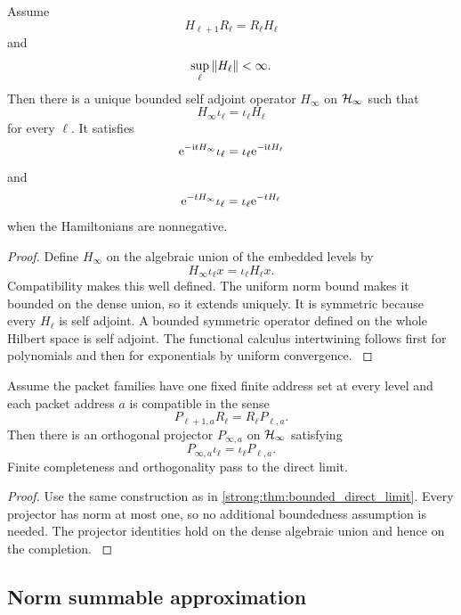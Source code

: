 \begin{theorem}\label{strong:theorem:045}\label{strong:thm:bounded_direct_limit}
Assume
\[
H_{\ell+1}R_\ell=R_\ell H_\ell
\]
and
\[
\sup_\ell\left\lVert H_\ell\right\rVert<\infty.
\]
Then there is a unique bounded self adjoint operator \(H_\infty\) on \(\Hcal_\infty\) such that
\[
H_\infty\iota_\ell=\iota_\ell H_\ell
\]
for every \(\ell\). It satisfies
\[
\e^{-\ii tH_\infty}\iota_\ell
=
\iota_\ell\e^{-\ii tH_\ell}
\]
and
\[
\e^{-tH_\infty}\iota_\ell
=
\iota_\ell\e^{-tH_\ell}
\]
when the Hamiltonians are nonnegative.
\end{theorem}

\begin{proof}\label{strong:proof:073}
Define \(H_\infty\) on the algebraic union of the embedded levels by
\[
H_\infty\iota_\ell x=\iota_\ell H_\ell x.
\]
Compatibility makes this well defined. The uniform norm bound makes it bounded on the dense union, so it extends uniquely. It is symmetric because every \(H_\ell\) is self adjoint. A bounded symmetric operator defined on the whole Hilbert space is self adjoint. The functional calculus intertwining follows first for polynomials and then for exponentials by uniform convergence.
\label{strong:proof:073:end}\end{proof}

\begin{theorem}\label{strong:theorem:046}\label{strong:thm:packet_direct_limit}
Assume the packet families have one fixed finite address set at every level and each packet address \(a\) is compatible in the sense
\[
P_{\ell+1,a}R_\ell=R_\ell P_{\ell,a}.
\]
Then there is an orthogonal projector \(P_{\infty,a}\) on \(\Hcal_\infty\) satisfying
\[
P_{\infty,a}\iota_\ell=\iota_\ell P_{\ell,a}.
\]
Finite completeness and orthogonality pass to the direct limit.
\end{theorem}

\begin{proof}\label{strong:proof:074}
Use the same construction as in \cref{strong:thm:bounded_direct_limit}. Every projector has norm at most one, so no additional boundedness assumption is needed. The projector identities hold on the dense algebraic union and hence on the completion.
\label{strong:proof:074:end}\end{proof}

\subsection{Norm summable approximation}\label{strong:subsec:norm_summable}

